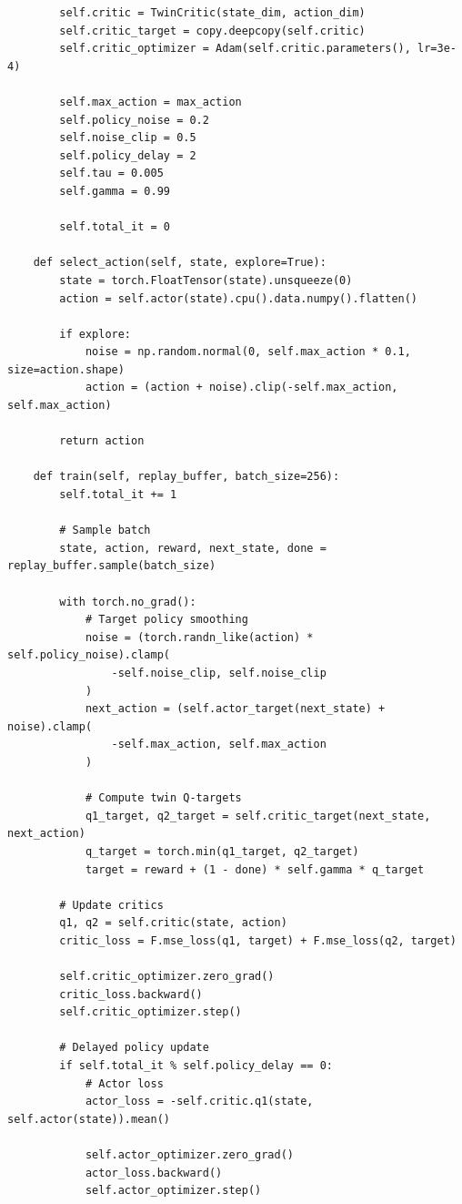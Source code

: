 \documentclass[12pt]{article}
\begin{document}
{{\begin{verbatim}
        self.critic = TwinCritic(state_dim, action_dim)
        self.critic_target = copy.deepcopy(self.critic)
        self.critic_optimizer = Adam(self.critic.parameters(), lr=3e-4)

        self.max_action = max_action
        self.policy_noise = 0.2
        self.noise_clip = 0.5
        self.policy_delay = 2
        self.tau = 0.005
        self.gamma = 0.99

        self.total_it = 0

    def select_action(self, state, explore=True):
        state = torch.FloatTensor(state).unsqueeze(0)
        action = self.actor(state).cpu().data.numpy().flatten()

        if explore:
            noise = np.random.normal(0, self.max_action * 0.1, size=action.shape)
            action = (action + noise).clip(-self.max_action, self.max_action)

        return action

    def train(self, replay_buffer, batch_size=256):
        self.total_it += 1

        # Sample batch
        state, action, reward, next_state, done = replay_buffer.sample(batch_size)

        with torch.no_grad():
            # Target policy smoothing
            noise = (torch.randn_like(action) * self.policy_noise).clamp(
                -self.noise_clip, self.noise_clip
            )
            next_action = (self.actor_target(next_state) + noise).clamp(
                -self.max_action, self.max_action
            )

            # Compute twin Q-targets
            q1_target, q2_target = self.critic_target(next_state, next_action)
            q_target = torch.min(q1_target, q2_target)
            target = reward + (1 - done) * self.gamma * q_target

        # Update critics
        q1, q2 = self.critic(state, action)
        critic_loss = F.mse_loss(q1, target) + F.mse_loss(q2, target)

        self.critic_optimizer.zero_grad()
        critic_loss.backward()
        self.critic_optimizer.step()

        # Delayed policy update
        if self.total_it % self.policy_delay == 0:
            # Actor loss
            actor_loss = -self.critic.q1(state, self.actor(state)).mean()

            self.actor_optimizer.zero_grad()
            actor_loss.backward()
            self.actor_optimizer.step()


\end{verbatim}}}
\end{document}
